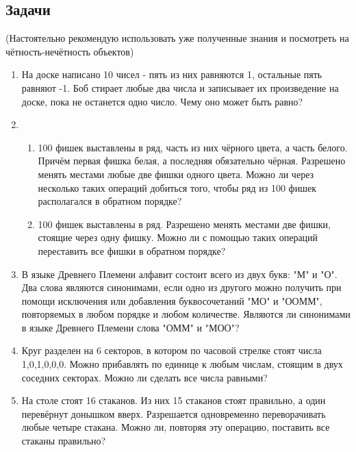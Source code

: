 \documentclass[a4paper,12pt]{article}
\begin{document}
    \subsection*{Задачи}
    (Настоятельно рекомендую использовать уже полученные знания и посмотреть на чётность-нечётность объектов)
    \begin{enumerate}
        \item На доске написано 10 чисел - пять из них равняются 1, остальные пять равняют -1. Боб стирает любые два числа и записывает их произведение на доске, пока не останется одно число. Чему оно может быть равно?
        \item \begin{enumerate}
            \item 100 фишек выставлены в ряд, часть из них чёрного цвета, а часть белого. Причём первая фишка белая, а последняя обязательно чёрная. Разрешено менять местами любые две фишки одного цвета. Можно ли через несколько таких операций добиться того, чтобы ряд из 100 фишек располагался в обратном порядке? 
            \item 100 фишек выставлены в ряд. Разрешено менять местами две фишки, стоящие через одну фишку. Можно ли с помощью таких операций переставить все фишки в обратном порядке?
        \end{enumerate}
        \item В языке Древнего Племени алфавит состоит всего из двух букв: "М" и "О". Два слова являются синонимами, если одно из другого можно получить при помощи исключения или добавления буквосочетаний "МО" и "ООММ", повторяемых в любом порядке и любом количестве. Являются ли синонимами в языке Древнего Племени слова "ОММ" и "МОО"?
        \item Круг разделен на 6 секторов, в котором по часовой стрелке стоят числа 1,0,1,0,0,0. Можно прибавлять по единице к любым числам, стоящим в двух соседних секторах. Можно ли сделать все числа равными?
        \item На столе стоят 16 стаканов. Из них 15 стаканов стоят правильно, а один перевёрнут донышком вверх. Разрешается одновременно переворачивать любые четыре стакана. Можно ли, повторяя эту операцию, поставить все стаканы правильно?
    \end{enumerate}
\end{document}
